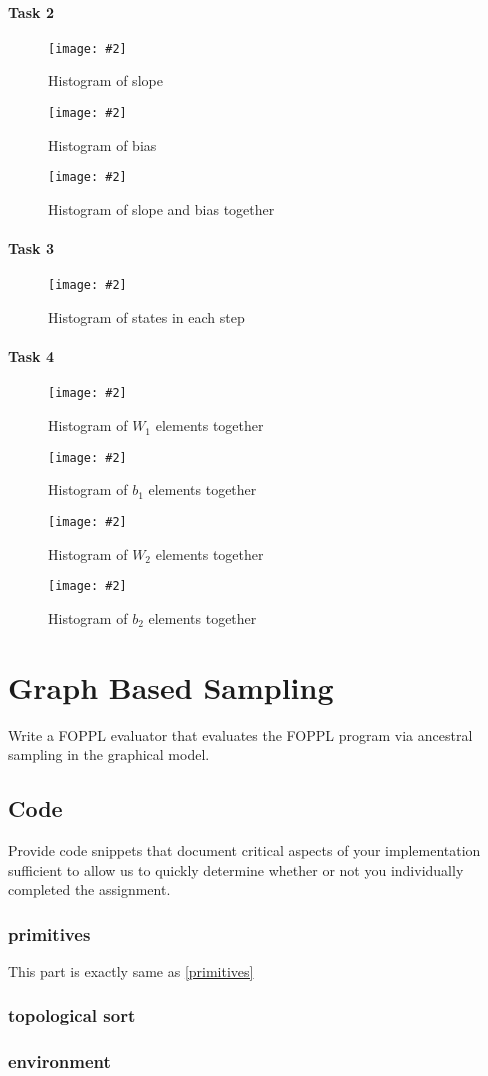 \documentclass{article}
\def\blu#1{{\color{blu}#1}}
\newcommand{\centerfigcap}[3]{\begin{figure}[H]
\begin{center}\texttt{[image: \#2]} \caption{#3}\end{center}
\end{figure}}
\begin{document}
\paragraph{Task 2}
\centerfigcap{0.6}{../Results/eval_2_slope}{Histogram of slope}
\centerfigcap{0.6}{../Results/eval_2_bias}{Histogram of bias}
\centerfigcap{0.7}{../Results/eval_2_both}{Histogram of slope and bias together}
\paragraph{Task 3}
\centerfigcap{1}{../Results/eval_3}{Histogram of states in each step}
\paragraph{Task 4}
\centerfigcap{0.7}{../Results/eval_4_w1}{Histogram of $W_1$ elements together}
\centerfigcap{0.7}{../Results/eval_4_b1}{Histogram of $b_1$ elements together}
\centerfigcap{1}{../Results/eval_4_w2}{Histogram of $W_2$ elements together}
\centerfigcap{0.7}{../Results/eval_4_b2}{Histogram of $b_2$ elements together}
\pagebreak
\section{Graph Based Sampling}
\blu{Write a FOPPL evaluator that evaluates the FOPPL program via ancestral sampling in the graphical model.}

\subsection{Code}
\blu{Provide code snippets that document critical aspects of your implementation sufficient to allow us to quickly determine whether or not you individually completed the assignment.}
\subsubsection{primitives}
This part is exactly same as \ref{primitives}
\subsubsection{topological sort}

\subsubsection{environment}

\end{document}
